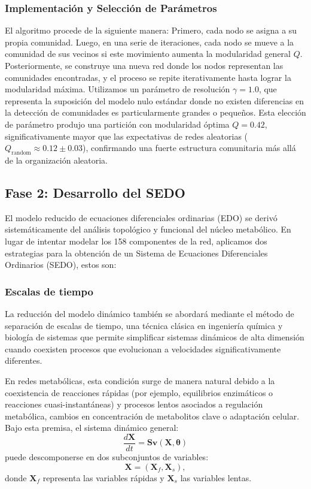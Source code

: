 \documentclass[12pt,spanish]{article}
\begin{document}
	\subsubsection{Implementación y Selección de Parámetros}
	El algoritmo procede de la siguiente manera: Primero, cada nodo se asigna a su propia comunidad. Luego, en una serie de iteraciones, cada nodo se mueve a la comunidad de sus vecinos si este movimiento aumenta la modularidad general $Q$. Posteriormente, se construye una nueva red donde los nodos representan las comunidades encontradas, y el proceso se repite iterativamente hasta lograr la modularidad máxima. Utilizamos un parámetro de resolución $\gamma = 1.0$, que representa la suposición del modelo nulo estándar donde no existen diferencias en la detección de comunidades es particularmente grandes o pequeños. Esta elección de parámetro produjo una partición con modularidad óptima $Q = 0.42$, significativamente mayor que las expectativas de redes aleatorias ($Q_{\text{random}} \approx 0.12 \pm 0.03$), confirmando una fuerte estructura comunitaria más allá de la organización aleatoria.\\
	
	\subsection*{Fase 2: Desarrollo del SEDO}
	
	El modelo reducido de ecuaciones diferenciales ordinarias (EDO) se derivó sistemáticamente del análisis topológico y funcional del núcleo metabólico. En lugar de intentar modelar los 158 componentes de la red, aplicamos dos estrategias para la obtención de un Sistema de Ecuaciones Diferenciales Ordinarios (SEDO), estos son:
		\subsubsection{Escalas de tiempo}
	
	La reducción del modelo dinámico también se abordará mediante el método de separación de escalas de tiempo, una técnica clásica en ingeniería química y biología de sistemas que permite simplificar sistemas dinámicos de alta dimensión cuando coexisten procesos que evolucionan a velocidades significativamente diferentes.
	
	En redes metabólicas, esta condición surge de manera natural debido a la coexistencia de reacciones rápidas (por ejemplo, equilibrios enzimáticos o reacciones cuasi-instantáneas) y procesos lentos asociados a regulación metabólica, cambios en concentración de metabolitos clave o adaptación celular. Bajo esta premisa, el sistema dinámico general:
	\[
	\frac{d\mathbf{X}}{dt} = \mathbf{S}\mathbf{v}(\mathbf{X},\boldsymbol{\theta})
	\]
	puede descomponerse en dos subconjuntos de variables:
	\[
	\mathbf{X} = (\mathbf{X}_f, \mathbf{X}_s),
	\]
	donde $\mathbf{X}_f$ representa las variables rápidas y $\mathbf{X}_s$ las variables lentas.
	
\end{document}
